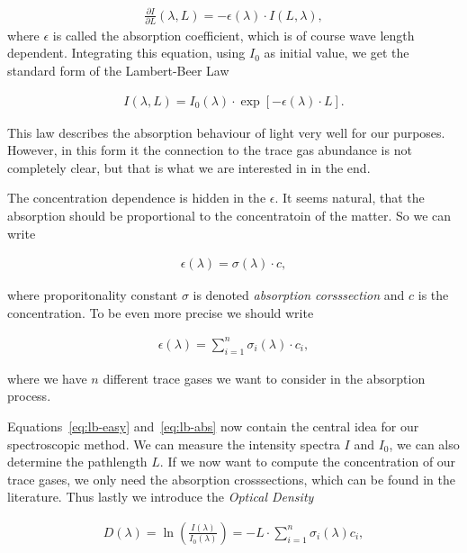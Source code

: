 \begin{align*}
  \frac{\partial I}{\partial L}(\lambda, L) = - \epsilon(\lambda)
  \cdot I(L, \lambda),
\end{align*}
where $\epsilon$ is called the absorption coefficient, which is of
course wave length dependent. Integrating this equation, using $I_0$
as initial value, we get the standard form of the Lambert-Beer Law

\begin{align}
  I(\lambda, L) = I_0(\lambda) \cdot \exp[-\epsilon(\lambda) \cdot
  L]. \label{eq:lb-easy}
\end{align}

This law describes the absorption behaviour of light very well for our
purposes. However, in this form it the connection to the trace gas
abundance is not completely clear, but that is what we are interested
in in the end.

The concentration dependence is hidden in the $\epsilon$. It seems
natural, that the absorption should be proportional to the
concentratoin of the matter. So we can write

\begin{align*}
  \epsilon(\lambda) = \sigma(\lambda) \cdot c,
\end{align*}

where proporitonality constant $\sigma$ is denoted \emph{absorption
  corsssection} and $c$ is the concentration. To be even more precise
we should write

\begin{align}
  \epsilon(\lambda) = \sum_{i=1}^n \sigma_i(\lambda) \cdot c_i, \label{eq:lb-abs}
\end{align}

where we have $n$ different trace gases we want to consider in the
absorption process. 

Equations~\eqref{eq:lb-easy} and~\eqref{eq:lb-abs} now contain the central idea for our
spectroscopic method. We can measure the intensity spectra $I$ and
$I_0$, we can also determine the pathlength $L$. If we now want to
compute the concentration of our trace gases, we only need the
absorption crosssections, which can be found in the
literature. Thus lastly we introduce the \emph{Optical
  Density} 

\begin{align*}
  D(\lambda) = \ln \left(\frac{I(\lambda)}{I_0(\lambda)}\right) = - L
  \cdot \sum_{i=1}^n \sigma_i(\lambda) c_i,
\end{align*}

